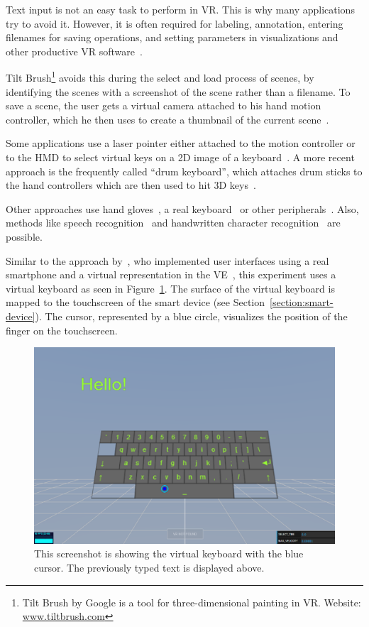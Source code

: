 Text input is not an easy task to perform in \gls{VR}. This is why many applications try to avoid it. However, it is often required for labeling, annotation, entering filenames for saving operations, and setting parameters in visualizations and other productive \gls{VR} software~\cite[2154]{Rhoton.2002}. 

Tilt Brush\footnote{Tilt Brush by Google is a tool for three-dimensional painting in VR. Website: \href{https://www.tiltbrush.com/}{www.tiltbrush.com}} avoids this during the select and load process of scenes, by identifying the scenes with a screenshot of the scene rather than a filename. To save a scene, the user gets a virtual camera attached to his hand motion controller, which he then uses to create a thumbnail of the current scene~\cite{GoogleLLC.2019}. %

Some applications use a laser pointer either attached to the motion controller or to the \gls{HMD} to select virtual keys on a \gls{2D} image of a keyboard~\cite{WeelcoInc.2017}. A more recent approach is the frequently called \enquote{drum keyboard}, which attaches drum sticks to the hand controllers which are then used to hit \gls{3D} keys~\cite{Weisel.2017}.

Other approaches use hand gloves~\cite{Evans.1999,Rhoton.2002}, a real keyboard~\cite{McGill.2015,Walker.2017} or other peripherals~\cite[111\psq]{Gonzalez.2009}. Also, methods like speech recognition~\cite[2154\psqq]{Rhoton.2002} and handwritten character recognition~\cite[113]{Gonzalez.2009} are possible.

Similar to the approach by~\citeauthor{Dias.2018}, who implemented user interfaces using a real smartphone and a virtual representation in the \gls{VE}~\cite[5]{Dias.2018}, this experiment uses a virtual keyboard as seen in Figure~\ref{fig:screenshot-exp-vk}.
The surface of the virtual keyboard is mapped to the touchscreen of the smart device (see Section~\ref{section:smart-device}). The cursor, represented by a blue circle, visualizes the position of the finger on the touchscreen.

\begin{figure}[H]
	\centering
	\includegraphics[width=12cm]{figures/implementation/screenshot_exp_vk.png}
	\caption[Screenshot of the virtual keyboard]{This screenshot is showing the virtual keyboard with the blue cursor. The previously typed text is displayed above.}\label{fig:screenshot-exp-vk}
\end{figure}

